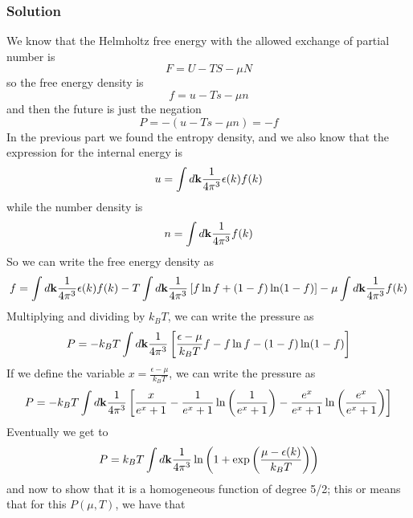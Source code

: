 \documentclass[12pt]{article}
\begin{document}
\subsubsection{Solution}
We know that the Helmholtz free energy with the allowed exchange of partial number is
\begin{equation}
    F = U - TS - \mu N
\end{equation}
so the free energy density is
\begin{equation}
    f = u - Ts - \mu n
\end{equation}
and then the future is just the negation
\begin{equation}
    P = -\left( u - Ts - \mu n \right) = -f
\end{equation}
In the previous part we found the entropy density, and we also know that the expression for the internal energy is
\begin{equation}
    u = \int d \vb{k} \frac{1}{4\pi^3} \epsilon(k) f(k)
\end{equation}
while the number density is
\begin{equation}
    n = \int d \vb{k} \frac{1}{4\pi^3} f(k)
\end{equation}
So we can write the free energy density as
\begin{equation}
    f = \int d \vb{k} \frac{1}{4\pi^3} \epsilon(k) f(k) - T \int d \vb{k} \frac{1}{4\pi^3} \left[ f \ln f + (1 - f) \ln (1 - f) \right] - \mu \int d \vb{k} \frac{1}{4\pi^3} f(k)
\end{equation}
Multiplying and dividing by \( k_B T \), we can write the pressure as
\begin{equation}
    P = -k_B T \int d \vb{k} \frac{1}{4\pi^3} \left[ \frac{\epsilon -\mu}{k_B T} f - f \ln f - (1 - f) \ln (1 - f) \right]
\end{equation}
If we define the variable $x = \frac{\epsilon - \mu}{k_B T}$, we can write the pressure as
\begin{equation}
    P = -k_B T \int d \vb{k} \frac{1}{4\pi^3} \left[ \frac{x}{e^x + 1} - \frac{1}{e^x + 1} \ln \left( \frac{1}{e^x + 1} \right) - \frac{e^x}{e^x + 1} \ln \left( \frac{e^x}{e^x + 1} \right) \right]
\end{equation}
Eventually we get to 
\begin{equation}
    P = k_B T \int d \vb{k} \frac{1}{4\pi^3} \ln \left( 1 + \exp \left( \frac{\mu - \epsilon(k)}{k_B T} \right) \right)
\end{equation}
and now to show that it is a homogeneous function of degree 5/2; this or means that for this $P(\mu, T)$, we have that
\end{document}
